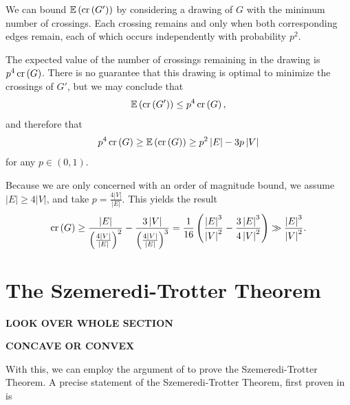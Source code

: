 \documentclass[12pt,reqno]{amsart}
\begin{document}
We can bound \(\mathbb{E} \left( \operatorname{cr}\left( G' \right)  \right) \) by considering a drawing of \(G\) with the minimum number of crossings. 
Each crossing remains and only when both corresponding edges remain, each of which occurs independently with probability
\(p^{2}\).

The expected value of the number of crossings remaining in the drawing is \(p^{4} \operatorname{cr}\left( G \right) \).
There is no guarantee that this drawing is optimal to minimize the crossings of \(G'\), but we may conclude that
\[
    \mathbb{E} \left( \operatorname{cr}\left( G' \right)  \right) \leq p ^{4} \operatorname{cr}\left( G \right)
,\]
and therefore that
\[
    p^{4} \operatorname{cr}\left( G \right) \geq \mathbb{E} \left( \operatorname{cr}\left( G \right)  \right) \geq p^{2} \left\lvert E \right\rvert - 3 p \left\lvert V \right\rvert 
\]
for any \(p \in (0,1)\). 


Because we are only concerned with an order of magnitude bound, we assume \(\left\lvert E \right\rvert \geq 4\left\lvert V \right\rvert \), and take \(p = \frac{4\left\lvert V \right\rvert }{\left\lvert E \right\rvert }\).
This yields the result
\[
    \operatorname{cr}\left( G \right) \geq \frac{\left\lvert E \right\rvert }{\left( \frac{4 \left\lvert V \right\rvert }{\left\lvert E \right\rvert }   \right)^{2} } - \frac{3 \left\lvert V \right\rvert }{\left( \frac{4 \left\lvert V \right\rvert }{\left\lvert E \right\rvert }  \right) ^{3} } = \frac{1}{16} \left( \frac{\left\lvert E \right\rvert ^{3} }{\left\lvert V \right\rvert ^{2}} - \frac{3 \left\lvert E \right\rvert ^{3} }{4 \left\lvert V \right\rvert ^{2}}  \right) \gg \frac{\left\lvert E \right\rvert ^{3} }{\left\lvert V \right\rvert ^{2}}
.\]

\section{The Szemeredi-Trotter Theorem}

\textbf{LOOK OVER WHOLE SECTION}

\textbf{CONCAVE OR CONVEX}

With this, we can employ the argument of \cite{szekely-SzT} to prove the Szemeredi-Trotter Theorem.
A precise statement of the Szemeredi-Trotter Theorem, first proven in \cite{SzT-original} is
\end{document}
